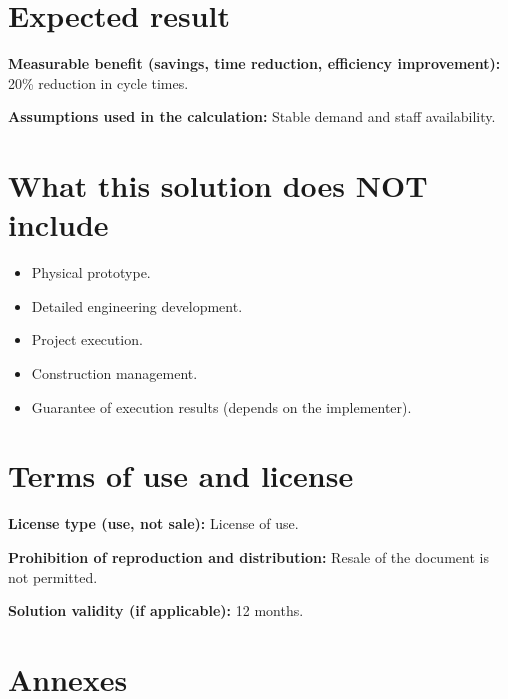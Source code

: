 \documentclass[11pt,a4paper]{article}
\newcommand{\campo}[2]{\noindent\textbf{\textcolor{irdblack}{#1:}} \textcolor{irdblack}{#2}\par\vspace{0.3em}}
\begin{document}
\section{Expected result}

\campo{Measurable benefit (savings, time reduction, efficiency improvement)}{20\% reduction in cycle times.}
\campo{Assumptions used in the calculation}{Stable demand and staff availability.}

\section{What this solution does NOT include}

\begin{alertbox}
\begin{itemize}[leftmargin=1.2em, itemsep=2pt]
    \item Physical prototype.
    \item Detailed engineering development.
    \item Project execution.
    \item Construction management.
    \item Guarantee of execution results (depends on the implementer).
\end{itemize}
\end{alertbox}

\section{Terms of use and license}

\campo{License type (use, not sale)}{License of use.}
\campo{Prohibition of reproduction and distribution}{Resale of the document is not permitted.}
\campo{Solution validity (if applicable)}{12 months.}

\section{Annexes}
\end{document}
